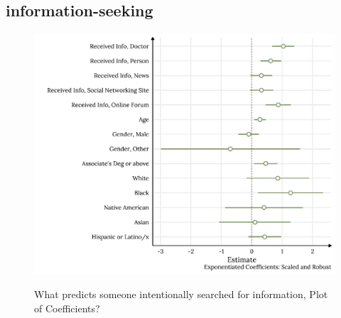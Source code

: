 \hypertarget{information-seeking}{%
\subsection{information-seeking}\label{information-seeking}}



\begin{figure}[h]
{\centering \includegraphics[width=0.8\linewidth]{figs/paper2/plot-model-1-1}}
\caption{What predicts someone intentionally searched for information, Plot of Coefficients?}\label{fig:plot-model-1}
\end{figure}

